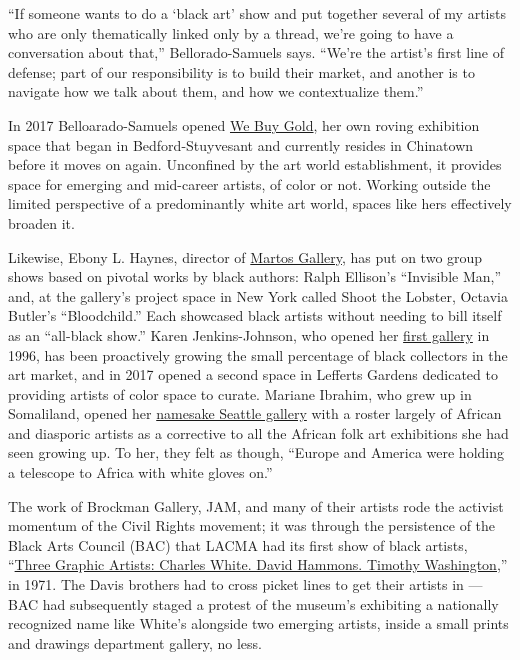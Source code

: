 ``If someone wants to do a `black art' show and put together several of
my artists who are only thematically linked only by a thread, we're
going to have a conversation about that,'' Bellorado-Samuels says.
``We're the artist's first line of defense; part of our responsibility
is to build their market, and another is to navigate how we talk about
them, and how we contextualize them.''

In 2017 Belloarado-Samuels opened \href{https://webuygold.wtf/}{We Buy
Gold}, her own roving exhibition space that began in Bedford-Stuyvesant
and currently resides in Chinatown before it moves on again. Unconfined
by the art world establishment, it provides space for emerging and
mid-career artists, of color or not. Working outside the limited
perspective of a predominantly white art world, spaces like hers
effectively broaden it.

Likewise, Ebony L. Haynes, director of
\href{http://www.martosgallery.com/}{Martos Gallery}, has put on two
group shows based on pivotal works by black authors: Ralph Ellison's
``Invisible Man,'' and, at the gallery's project space in New York
called Shoot the Lobster, Octavia Butler's ``Bloodchild.'' Each
showcased black artists without needing to bill itself as an ``all-black
show.'' Karen Jenkins-Johnson, who opened her
\href{http://www.jenkinsjohnsongallery.com/}{first gallery} in 1996, has
been proactively growing the small percentage of black collectors in the
art market, and in 2017 opened a second space in Lefferts Gardens
dedicated to providing artists of color space to curate. Mariane
Ibrahim, who grew up in Somaliland, opened her
\href{http://marianeibrahim.com/}{namesake Seattle gallery} with a
roster largely of African and diasporic artists as a corrective to all
the African folk art exhibitions she had seen growing up. To her, they
felt as though, ``Europe and America were holding a telescope to Africa
with white gloves on.''

The work of Brockman Gallery, JAM, and many of their artists rode the
activist momentum of the Civil Rights movement; it was through the
persistence of the Black Arts Council (BAC) that LACMA had its first
show of black artists,
``\href{http://www.lacma.org/sites/default/files/ThreeGraphicArtists.pdf}{Three
Graphic Artists: Charles White. David Hammons. Timothy Washington,}'' in
1971. The Davis brothers had to cross picket lines to get their artists
in --- BAC had subsequently staged a protest of the museum's exhibiting
a nationally recognized name like White's alongside two emerging
artists, inside a small prints and drawings department gallery, no less.

